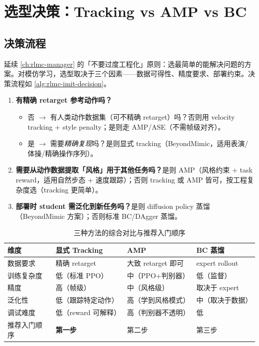 \section{选型决策：Tracking vs AMP vs BC}
\label{sec:rlmc-imit-choose}

\subsection{决策流程}
\label{sec:rlmc-imit-choose-flow}

延续 \cref{ch:rlmc-manager} 的「不要过度工程化」原则：选最简单的能解决问题的方案。对模仿学习，选型取决于三个因素——数据可得性、精度要求、部署约束。决策流程如 \cref{alg:rlmc-imit-decision}。

\begin{algo}[模仿学习方法选型决策流程]\label{alg:rlmc-imit-decision}
\begin{enumerate}
  \item \textbf{有精确 retarget 参考动作吗？}
    \begin{itemize}
      \item 否 $\to$ 有人类动作数据集（可不精确 retarget）吗？否则用 velocity tracking + style penalty；是则走 AMP/ASE（不需帧级对齐）。
      \item 是 $\to$ 需要\emph{精确复现}吗？是则显式 tracking（BeyondMimic，适用表演/体操/精确操作序列）。
    \end{itemize}
  \item \textbf{需要从动作数据提取「风格」用于其他任务吗？}是则 AMP（风格约束 + task reward，适用自然步态 + 速度跟踪）；否则 tracking 或 AMP 皆可，按工程复杂度选（tracking 更简单）。
  \item \textbf{部署时 student 需泛化到新任务吗？}是则 diffusion policy 蒸馏（BeyondMimic 方案）；否则标准 BC/DAgger 蒸馏。
\end{enumerate}
\end{algo}

\begin{table}[ht]
\centering
\small
\caption{三种方法的综合对比与推荐入门顺序}
\label{tab:rlmc-imit-choose}
\begin{tabular}{@{}llll@{}}
\toprule
维度 & 显式 Tracking & AMP & BC 蒸馏 \\
\midrule
数据要求 & 精确 retarget & 大致 retarget 即可 & expert rollout \\
训练复杂度 & 低（标准 PPO） & 中（PPO+判别器） & 低（监督） \\
精度 & 高（帧级） & 中（风格级） & 取决于 expert \\
泛化性 & 低（跟踪特定动作） & 高（学到风格模式） & 中（取决于数据） \\
调试难度 & 低（reward 可解释） & 高（判别器不透明） & 低 \\
推荐入门顺序 & \textbf{第一步} & 第二步 & 第三步 \\
\bottomrule
\end{tabular}
\end{table}

